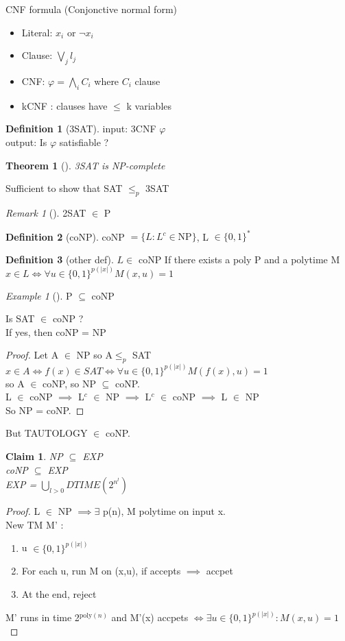 \documentclass{article}
\newtheorem{claim}{Claim}
\newtheorem{theorem}{Theorem}
\theoremstyle{definition}
\newtheorem{definition}{Definition}
\theoremstyle{remark}
\newtheorem*{remark}{Remark}
\newtheorem*{example}{Example}
\newcommand{\Thm}[3]{\begin{theorem}[#1]\label{#2}#3\end{theorem}}
\newcommand{\Ex}[3]{\begin{example}[#1]\label{#2}#3\end{example}}
\newcommand{\Def}[3]{\begin{definition}[#1]\label{#2}#3\end{definition}}
\newcommand{\Rem}[3]{\begin{remark}[#1]\label{#2}#3\end{remark}}
\newcommand{\Proof}[1]{\begin{proof}#1\end{proof}}
\begin{document}
CNF formula (Conjonctive normal form)
\begin{itemize}
	\item Literal: $x_i$ or $\neg x_i$
	\item Clause: $\bigvee\limits_{j} l_j$
	\item CNF: $\varphi = \bigwedge\limits_i C_i$ where $C_i$ clause
	\item kCNF : clauses have $\leq$ k variables
\end{itemize}

\Def{3SAT}{}{input: 3CNF $\varphi$\\
	output: Is $\varphi$ satisfiable ?}

\Thm{}{}{3SAT is NP-complete}
Sufficient to show that SAT $\leq_p$ 3SAT

\Rem{}{}{2SAT $\in$ P}

\Def{coNP}{}{coNP $= \{L:L^c \in \text{NP}\}$, L $\in \{0,1\}^*$}

\Def{other def}{}{$L \in$ coNP If there exists a poly P and a polytime M\\
	$x \in L \Longleftrightarrow \forall u\in\{0,1\}^{p(|x|)} M(x,u) = 1$}

\Ex{}{}{P $\subseteq$ coNP}

Is SAT $\in$ coNP ?\\
If yes, then coNP = NP
\Proof{Let A $\in$ NP so A$\leq_p$ SAT\\
	$x \in A \Longleftrightarrow f(x) \in SAT \Longleftrightarrow \forall u \in\{0,1\}^{p(|x|)} M(f(x),u) = 1$\\
so A $\in$ coNP,
so NP $\subseteq$ coNP.\\
L $\in$ coNP $\implies$ L$^c$ $\in$ NP $\implies$ L$^c$ $\in$ coNP $\implies$ L $\in$ NP\\
So NP = coNP.}

But TAUTOLOGY $\in$ coNP.\\

\begin{claim}
	NP $\subseteq$ EXP\\
	coNP $\subseteq$ EXP\\
	EXP = $\bigcup\limits_{l>0} DTIME(2^{n^l})$
\end{claim}
\Proof{L $\in$ NP $\implies \exists$ p(n), M polytime on input x.\\
	New TM M' :
	\begin{enumerate}
		\item u $\in \{0,1\}^{p(|x|)}$
		\item For each u, run M on (x,u), if accepts $\implies$ accpet
		\item At the end, reject
	\end{enumerate}

	M' runs in time 2$^{\text{poly}(n)}$ and M'(x) accpets $\Longleftrightarrow \exists u \in \{0,1\}^{p(|x|)}:M(x,u) = 1$}
\end{document}
